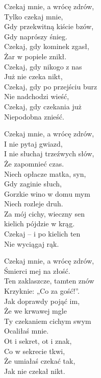 \begin{text}
Czekaj mnie, a wrócę zdrów,\\
Tylko czekaj mnie,\\
Gdy przekwitną kiście bzów,\\
Gdy naprószy śnieg.\\
Czekaj, gdy kominek zgasł,\\
Żar w popiele znikł.\\
Czekaj, gdy nikogo z nas\\
Już nie czeka nikt,\\
Czekaj, gdy po przejściu burz\\
Nie nadchodzi wieść,\\
Czekaj, gdy czekania już\\
Niepodobna znieść.

Czekaj mnie, a wrócę zdrów,\\
I nie pytaj gwiazd,\\
I nie słuchaj trzeźwych słów,\\
Że zapomnieć czas.\\
Niech opłacze matka, syn,\\
Gdy zaginie słuch,\\
Gorzkie wino w domu mym\\
Niech rozleje druh.\\
Za mój cichy, wieczny sen\\
kielich pójdzie w krąg.\\
Czekaj – i po kielich ten\\
Nie wyciągaj rąk.

Czekaj mnie, a wrócę zdrów,\\
Śmierci mej na złość.\\
Ten zaklaszcze, tamten znów\\
Krzyknie: „Co za gość!”.\\
Jak doprawdy pojąć im,\\
Że we krwawej mgle\\
Ty czekaniem cichym swym\\
Ocaliłaś mnie.\\
Ot i sekret, ot i znak,\\
Co w sekrecie tkwi,\\
Że umiałaś czekać tak,\\
Jak nie czekał nikt.
\end{text}
\begin{chord}
\end{chord}